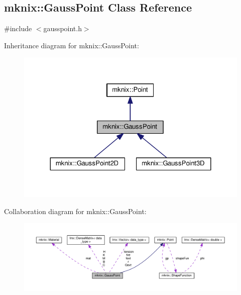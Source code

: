 \hypertarget{classmknix_1_1_gauss_point}{}\subsection{mknix\+:\+:Gauss\+Point Class Reference}
\label{classmknix_1_1_gauss_point}


{\ttfamily \#include $<$gausspoint.\+h$>$}



Inheritance diagram for mknix\+:\+:Gauss\+Point\+:\nopagebreak
\begin{figure}[H]
\begin{center}
\leavevmode
\includegraphics[width=324pt]{d1/d02/classmknix_1_1_gauss_point__inherit__graph}
\end{center}
\end{figure}


Collaboration diagram for mknix\+:\+:Gauss\+Point\+:\nopagebreak
\begin{figure}[H]
\begin{center}
\leavevmode
\includegraphics[width=350pt]{d4/d8d/classmknix_1_1_gauss_point__coll__graph}
\end{center}
\end{figure}
